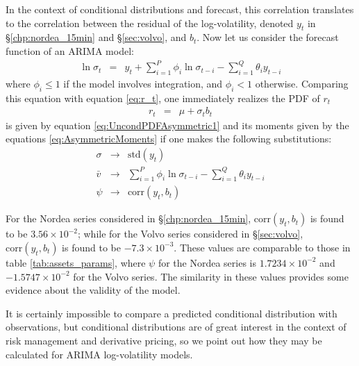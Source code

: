 In the context of conditional distributions and forecast, this
correlation translates to the correlation between the residual of the
log-volatility, denoted $y_t$ in \S\ref{chp:nordea_15min} and
\S\ref{sec:volvo}, and $b_t$. Now let us consider the forecast
function of an ARIMA model:
\begin{eqnarray*}
  \ln \sigma_t &=& y_t + \sum_{i=1}^P \phi_i \ln \sigma_{t-i} -
  \sum_{i=1}^Q \theta_i y_{t-i}
\end{eqnarray*}
where $\phi_i \leq 1$ if the model involves integration, and $\phi_i <
1$ otherwise. Comparing this equation with equation \ref{eq:r_t}, one
immediately realizes the PDF of $r_t$
\begin{eqnarray*}
  r_t &=& \mu + \sigma_t b_t
\end{eqnarray*}
is given by equation \ref{eq:UncondPDFAsymmetric1} and its moments
given by the equations \ref{eq:AsymmetricMoments} if one makes the
following substitutions:
\begin{eqnarray*}
  \sigma &\to& \text{std}(y_t) \\
  \bar{v} &\to& \sum_{i=1}^P \phi_i \ln \sigma_{t-i} - \sum_{i=1}^Q
  \theta_i y_{t-i} \\
  \psi &\to& \text{corr}(y_t, b_t)
\end{eqnarray*}

For the Nordea series considered in \S\ref{chp:nordea_15min},
$\text{corr}(y_t, b_t)$ is found to be $3.56 \times 10^{-2}$; while
for the Volvo series considered in \S\ref{sec:volvo},
$\text{corr}(y_t, b_t)$ is found to be $-7.3 \times 10^{-3}$. These
values are comparable to those in table \ref{tab:assets_params}, where
$\psi$ for the Nordea series is $1.7234 \times 10^{-2}$ and $-1.5747
\times 10^{-2}$ for the Volvo series. The similarity in these values
provides some evidence about the validity of the model.

It is certainly impossible to compare a predicted conditional
distribution with observations, but conditional distributions are of
great interest in the context of risk management and derivative
pricing, so we point out how they may be calculated for ARIMA
log-volatility models.
